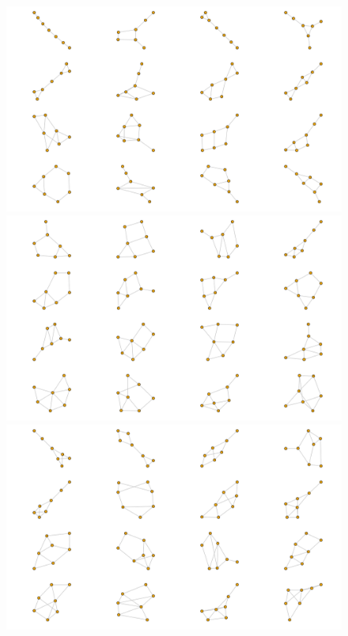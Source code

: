 \begin{figure}[h!]
    \subfloat
    {\includegraphics[width=0.95\linewidth]{atlas/atlas7-5.png}} \\
	\subfloat
    {\includegraphics[width=0.95\linewidth]{atlas/atlas7-6.png}} \\
	\subfloat
    {\includegraphics[width=0.95\linewidth]{atlas/atlas7-7.png}} 
\end{figure}

